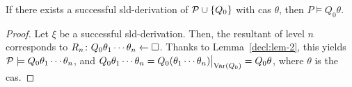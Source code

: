 \begin{thm}
    If there exists a successful \gls{sld}-derivation of \(\mathcal{P} \cup \lbrace Q_0 \rbrace\) with \gls{cas} \(\theta\), then \(P \models Q_0\theta\).
\end{thm}
\begin{proof}
    Let \(\xi\) be a successful \gls{sld}-derivation.
    Then, the resultant of level \(n\) corresponds to \(R_n \colon Q_0\theta_1\dotsb\theta_n \leftarrow \square\).
    Thanks to Lemma~\ref{decl:lem-2}, this yields \(\mathcal{P} \models Q_0\theta_1\dotsb\theta_n\), and \(Q_0\theta_1\dotsb\theta_n = Q_0\restr{(\theta_1\dotsb\theta_n)}{\Var(Q_0)} = Q_0\theta\), where \(\theta\) is the \gls{cas}.
\end{proof}